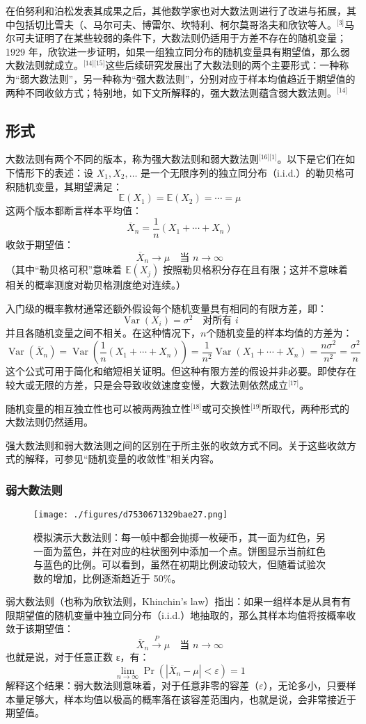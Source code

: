 在伯努利和泊松发表其成果之后，其他数学家也对大数法则进行了改进与拓展，其中包括切比雪夫（、马尔可夫、博雷尔、坎特利、柯尔莫哥洛夫和欣钦等人。\(^\text{[3]}\)马尔可夫证明了在某些较弱的条件下，大数法则仍适用于方差不存在的随机变量；1929 年，欣钦进一步证明，如果一组独立同分布的随机变量具有期望值，那么弱大数法则就成立。\(^\text{[14][15]}\)这些后续研究发展出了大数法则的两个主要形式：一种称为“弱大数法则”，另一种称为“强大数法则”，分别对应于样本均值趋近于期望值的两种不同收敛方式；特别地，如下文所解释的，强大数法则蕴含弱大数法则。\(^\text{[14]}\)
\subsection{形式}
大数法则有两个不同的版本，称为强大数法则和弱大数法则\(^\text{[16][1]}\)。以下是它们在如下情形下的表述：设 $X_1, X_2, \dots$ 是一个无限序列的独立同分布（i.i.d.）的勒贝格可积随机变量，其期望满足：
$$
\mathbb{E}(X_1) = \mathbb{E}(X_2) = \cdots = \mu~
$$
这两个版本都断言样本平均值：
$$
\overline{X}_n = \frac{1}{n}(X_1 + \cdots + X_n)~
$$
收敛于期望值：
$$
\overline{X}_n \to \mu \quad \text{当 } n \to \infty~
$$
（其中“勒贝格可积”意味着 $\mathbb{E}(X_j)$ 按照勒贝格积分存在且有限；这并不意味着相关的概率测度对勒贝格测度绝对连续。）

入门级的概率教材通常还额外假设每个随机变量具有相同的有限方差，即：
$$
\operatorname{Var}(X_i) = \sigma^2 \quad \text{对所有 } i~
$$
并且各随机变量之间不相关。在这种情况下，$n$个随机变量的样本均值的方差为：
$$
\operatorname{Var}(\overline{X}_n) = \operatorname{Var}\left(\frac{1}{n}(X_1 + \cdots + X_n)\right) = \frac{1}{n^2} \operatorname{Var}(X_1 + \cdots + X_n) = \frac{n\sigma^2}{n^2} = \frac{\sigma^2}{n}~
$$
这个公式可用于简化和缩短相关证明。但这种有限方差的假设并非必要。即使存在较大或无限的方差，只是会导致收敛速度变慢，大数法则依然成立\(^\text{[17]}\)。

随机变量的相互独立性也可以被两两独立性\(^\text{[18]}\)或可交换性\(^\text{[19]}\)所取代，两种形式的大数法则仍然适用。

强大数法则和弱大数法则之间的区别在于所主张的收敛方式不同。关于这些收敛方式的解释，可参见“随机变量的收敛性”相关内容。
\subsubsection{弱大数法则}
\begin{figure}[ht]
\centering
\texttt{[image: ./figures/d7530671329bae27.png]}
\caption{模拟演示大数法则：每一帧中都会抛掷一枚硬币，其一面为红色，另一面为蓝色，并在对应的柱状图列中添加一个点。饼图显示当前红色与蓝色的比例。可以看到，虽然在初期比例波动较大，但随着试验次数的增加，比例逐渐趋近于 50\%。} \label{fig_DSdl_4}
\end{figure}
弱大数法则（也称为欣钦法则，Khinchin's law）指出：如果一组样本是从具有有限期望值的随机变量中独立同分布（i.i.d.）地抽取的，那么其样本均值将按概率收敛于该期望值：
$$
\overline{X}_n \xrightarrow{P} \mu \quad \text{当 } n \to \infty~
$$
也就是说，对于任意正数 ε，有：
$$
\lim_{n \to \infty} \Pr\left(|\overline{X}_n - \mu| < \varepsilon\right) = 1~
$$
解释这个结果：弱大数法则意味着，对于任意非零的容差（$\varepsilon$），无论多小，只要样本量足够大，样本均值以极高的概率落在该容差范围内，也就是说，会非常接近于期望值。

